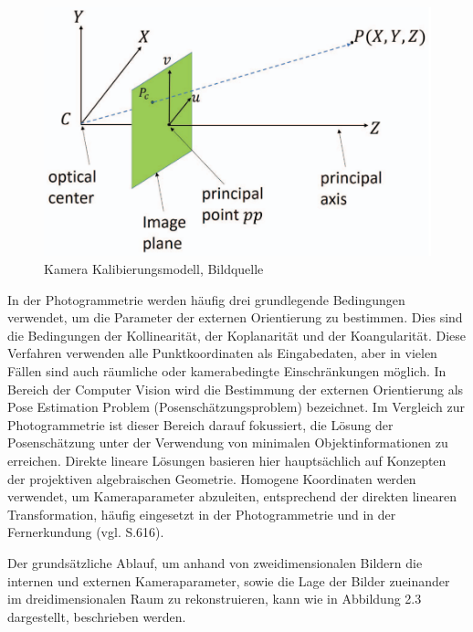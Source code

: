 \begin{figure}[H]
	\centering
	\includegraphics[scale=0.6]{pp.png}
	\caption{Kamera Kalibierungsmodell, Bildquelle \cite{pp}}
\end{figure} 

In der Photogrammetrie werden häufig drei grundlegende Bedingungen verwendet, um die Parameter der externen Orientierung zu bestimmen. Dies sind die Bedingungen der Kollinearität, der Koplanarität und der Koangularität. Diese Verfahren verwenden alle Punktkoordinaten als Eingabedaten, aber in vielen Fällen sind auch räumliche oder kamerabedingte Einschränkungen möglich. In Bereich der Computer Vision wird die Bestimmung der externen Orientierung als \glqq Pose Estimation Problem\grqq{} (Posenschätzungsproblem) bezeichnet. Im Vergleich zur Photogrammetrie ist dieser Bereich darauf fokussiert, die Lösung der Posenschätzung unter der Verwendung von minimalen Objektinformationen zu erreichen. Direkte lineare Lösungen basieren hier hauptsächlich auf Konzepten der projektiven algebraischen Geometrie. Homogene Koordinaten werden verwendet, um Kameraparameter abzuleiten, entsprechend der direkten linearen Transformation, häufig eingesetzt in der Photogrammetrie und in der Fernerkundung (vgl. \cite{exterior_review} S.616).

Der grundsätzliche Ablauf, um anhand von zweidimensionalen Bildern die internen und externen Kameraparameter, sowie die Lage der Bilder zueinander im dreidimensionalen Raum zu rekonstruieren, kann wie in Abbildung 2.3 dargestellt, beschrieben werden.

